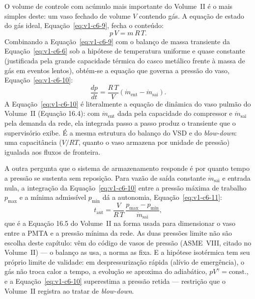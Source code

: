 \documentclass[12pt,a4paper]{article}
\numberwithin{equation}{section}
\numberwithin{table}{section}
\numberwithin{figure}{section}
\begin{document}
O volume de controle com acúmulo mais importante do Volume~II é o mais
simples deste: um vaso fechado de volume $V$ contendo gás. A equação de
estado do gás ideal, Equação~\eqref{eq:v1-c6-9}, fecha o conteúdo:
\begin{equation}\label{eq:v1-c6-9}
p\,V = m\,R\,T .
\end{equation}
Combinando a Equação~\eqref{eq:v1-c6-9} com o balanço de massa transiente da
Equação~\eqref{eq:v1-c6-6} sob a hipótese de temperatura uniforme e quase
constante (justificada pela grande capacidade térmica do casco metálico
frente à massa de gás em eventos lentos), obtém-se a equação que governa a
pressão do vaso, Equação~\eqref{eq:v1-c6-10}:
\begin{equation}\label{eq:v1-c6-10}
\frac{dp}{dt} = \frac{R\,T}{V}\left(\dot{m}_{\text{ent}} -
\dot{m}_{\text{sai}}\right) .
\end{equation}
A Equação~\eqref{eq:v1-c6-10} é literalmente a equação de dinâmica do vaso
pulmão do Volume~II (Equação 16.4): com $\dot{m}_{\text{ent}}$ dada pela
capacidade do compressor e $\dot{m}_{\text{sai}}$ pela demanda da rede, ela
integrada passo a passo produz o transiente que o supervisório exibe. É a
mesma estrutura do balanço do VSD e do \textit{blow-down}: uma capacitância
($V/RT$, quanto o vaso armazena por unidade de pressão) igualada aos fluxos de
fronteira.

A outra pergunta que o sistema de armazenamento responde é por quanto tempo a
pressão se sustenta sem reposição. Para vazão de saída constante
$\dot{m}_{\text{sai}}$ e entrada nula, a integração da
Equação~\eqref{eq:v1-c6-10} entre a pressão máxima de trabalho $p_{\text{max}}$
e a mínima admissível $p_{\text{min}}$ dá a autonomia, Equação~\eqref{eq:v1-c6-11}:
\begin{equation}\label{eq:v1-c6-11}
t_{\text{aut}} = \frac{V}{R\,T}\,\frac{p_{\text{max}} - p_{\text{min}}}{\dot{m}_{\text{sai}}} ,
\end{equation}
que é a Equação 16.5 do Volume~II na forma usada para dimensionar o vaso
entre a PMTA e a pressão mínima da rede. As duas pressões limite não são
escolha deste capítulo: vêm do código de vasos de pressão (ASME~VIII, citado
no Volume~II) --- o balanço as usa, a norma as fixa. E a hipótese isotérmica
tem seu próprio limite de validade: em despressurização rápida (alívio de
emergência), o gás não troca calor a tempo, a evolução se aproxima do
adiabático, $pV^{\gamma} = \text{const.}$, e a
Equação~\eqref{eq:v1-c6-10} superestima a pressão retida --- restrição que o
Volume~II registra ao tratar de \textit{blow-down}.
\end{document}
